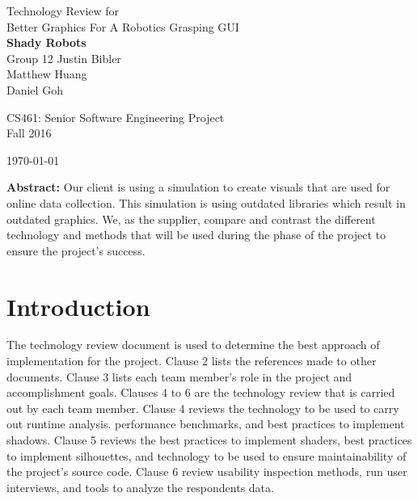 \documentclass[10pt,journal,compsoc,draftclsnofoot]{IEEEtran}
\begin{document}
\onecolumn

\begin{titlepage}
\null
\vspace{20mm}

\begin{flushleft}
\begin{bfseries}
	\vskip2mm
	\Huge{Technology Review for\\ Better Graphics For A Robotics Grasping GUI}\\
	\vspace{30mm}
	\textbf{\huge Shady Robots} \\
	\vskip2mm
	\large{Group 12}
	\vskip5mm
	\Large{Justin Bibler \\
	Matthew Huang \\
	Daniel Goh \\}
\end{bfseries}

\vspace{15mm}
\Large{CS461: Senior Software Engineering Project} \\
\Large{Fall 2016} \\

\vspace{10mm}

\today

\vfill

\begin{normalsize}
{\bf Abstract:}
Our client is using a simulation to create visuals that are used for online data collection.
This simulation is using outdated libraries which result in outdated graphics.
We, as the supplier, compare and contrast the different technology and methods that will be used during the phase of the project to ensure the project's success.
\end{normalsize}
\end{flushleft}
\end{titlepage}

\section{Introduction}
\vspace{3mm}
The technology review document is used to determine the best approach of implementation for the project. 
Clause 2 lists the references made to other documents.
Clause 3 lists each team member's role in the project and accomplishment goals.
Clauses 4 to 6 are the technology review that is carried out by each team member.
Clause 4 reviews the technology to be used to carry out runtime analysis. performance benchmarks, and best practices to implement shadows.
Clause 5 reviews the best practices to implement shaders, best practices to implement silhouettes, and technology to be used to ensure maintainability of the project's source code.
Clause 6 review usability inspection methods, run user interviews, and tools to analyze the respondents data.
\end{document}
